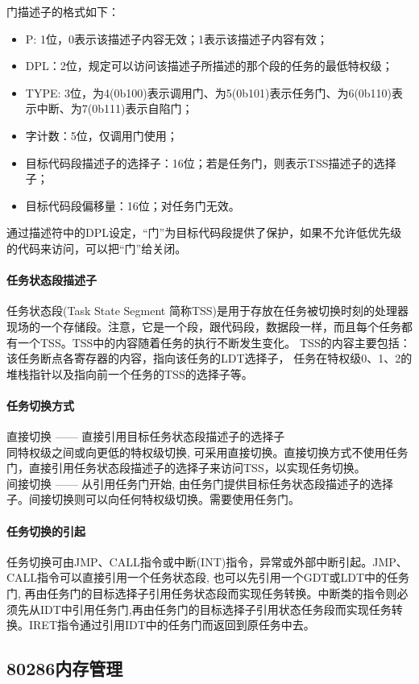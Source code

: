 \documentclass[12pt]{article}
\begin{document}
门描述子的格式如下：
\begin{itemize}
\item P: 1位，0表示该描述子内容无效；1表示该描述子内容有效；
\item DPL：2位，规定可以访问该描述子所描述的那个段的任务的最低特权级；
\item TYPE: 3位，为4(0b100)表示调用门、为5(0b101)表示任务门、为6(0b110)表示中断、为7(0b111)表示自陷门；
\item 字计数：5位，仅调用门使用；
\item 目标代码段描述子的选择子：16位；若是任务门，则表示TSS描述子的选择子；
\item 目标代码段偏移量：16位；对任务门无效。
\end{itemize}
通过描述符中的DPL设定，“门”为目标代码段提供了保护，如果不允许低优先级的代码来访问，可以把“门”给关闭。
\paragraph{任务状态段描述子}
任务状态段(Task State Segment 简称TSS)是用于存放在任务被切换时刻的处理器现场的一个存储段。注意，它是一个段，跟代码段，数据段一样，而且每个任务都有一个TSS。TSS中的内容随着任务的执行不断发生变化。 TSS的内容主要包括：该任务断点各寄存器的内容，指向该任务的LDT选择子， 任务在特权级0、1、2的堆栈指针以及指向前一个任务的TSS的选择子等。
\paragraph{任务切换方式}
直接切换 —— 直接引用目标任务状态段描述子的选择子\\
同特权级之间或向更低的特权级切换, 可采用直接切换。直接切换方式不使用任务门，直接引用任务状态段描述子的选择子来访问TSS，以实现任务切换。\\
间接切换 —— 从引用任务门开始, 由任务门提供目标任务状态段描述子的选择子。间接切换则可以向任何特权级切换。需要使用任务门。
\paragraph{任务切换的引起}
任务切换可由JMP、CALL指令或中断(INT)指令，异常或外部中断引起。JMP、CALL指令可以直接引用一个任务状态段, 也可以先引用一个GDT或LDT中的任务门, 再由任务门的目标选择子引用任务状态段而实现任务转换。中断类的指令则必须先从IDT中引用任务门,再由任务门的目标选择子引用状态任务段而实现任务转换。IRET指令通过引用IDT中的任务门而返回到原任务中去。
\subsection{80286内存管理}
\end{document}
